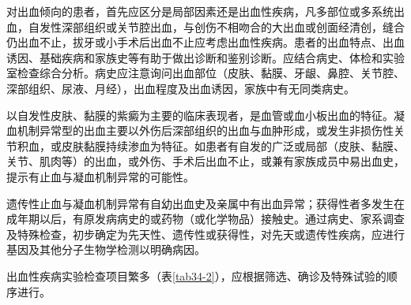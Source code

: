 对出血倾向的患者，首先应区分是局部因素还是出血性疾病，凡多部位或多系统出血，自发性深部组织或关节腔出血，与创伤不相吻合的大出血或创面经清创，缝合仍出血不止，拔牙或小手术后出血不止应考虑出血性疾病。患者的出血特点、出血诱因、基础疾病和家族史等有助于做出诊断和鉴别诊断。应结合病史、体检和实验室检查综合分析。病史应注意询问出血部位（皮肤、黏膜、牙龈、鼻腔、关节腔、深部组织、尿液、月经），出血程度及出血诱因，家族中有无同类病史。

以自发性皮肤、黏膜的紫癜为主要的临床表现者，是血管或血小板出血的特征。凝血机制异常型的出血主要以外伤后深部组织的出血与血肿形成，或发生非损伤性关节积血，或皮肤黏膜持续渗血为特征。如患者有自发的广泛或局部（皮肤、黏膜、关节、肌肉等）的出血，或外伤、手术后出血不止，或兼有家族成员中易出血史，提示有止血与凝血机制异常的可能性。

遗传性止血与凝血机制异常有自幼出血史及亲属中有出血异常；获得性者多发生在成年期以后，有原发病病史的或药物（或化学物品）接触史。通过病史、家系调查及特殊检查，初步确定为先天性、遗传性或获得性，对先天或遗传性疾病，应进行基因及其他分子生物学检测以明确病因。

出血性疾病实验检查项目繁多（表\ref{tab34-2}），应根据筛选、确诊及特殊试验的顺序进行。

